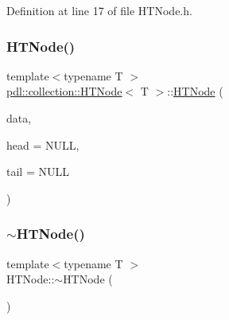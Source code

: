Definition at line 17 of file H\+T\+Node.\+h.


\begin{DoxyCode}{0}

\end{DoxyCode}
\mbox{\label{classpdl_1_1collection_1_1_h_t_node_a72036c32a7e927920ff35fd38893d75f}} 
\subsubsection{\texorpdfstring{HTNode()}{HTNode()}\hspace{0.1cm}{\footnotesize\ttfamily [2/2]}}
{\footnotesize\ttfamily template$<$typename T $>$ \\
\mbox{\hyperlink{classpdl_1_1collection_1_1_h_t_node}{pdl\+::collection\+::\+H\+T\+Node}}$<$ T $>$\+::\mbox{\hyperlink{classpdl_1_1collection_1_1_h_t_node}{H\+T\+Node}} (\begin{DoxyParamCaption}\item[{T \&}]{data,  }\item[{\mbox{\hyperlink{classpdl_1_1memory_1_1_ptr}{Ptr}}$<$ \mbox{\hyperlink{classpdl_1_1collection_1_1_h_t_node}{H\+T\+Node}}$<$ T $>$$>$}]{head = {\ttfamily NULL},  }\item[{\mbox{\hyperlink{classpdl_1_1memory_1_1_ptr}{Ptr}}$<$ \mbox{\hyperlink{classpdl_1_1collection_1_1_h_t_node}{H\+T\+Node}}$<$ T $>$$>$}]{tail = {\ttfamily NULL} }\end{DoxyParamCaption})}

\mbox{\label{classpdl_1_1collection_1_1_h_t_node_a75eaf253205f910d507e46710278c69d}} 
\subsubsection{\texorpdfstring{$\sim$HTNode()}{~HTNode()}}
{\footnotesize\ttfamily template$<$typename T $>$ \\
H\+T\+Node\+::$\sim$\+H\+T\+Node (\begin{DoxyParamCaption}{ }\end{DoxyParamCaption})}



